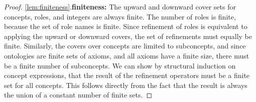 \begin{proof}
\item \ref{lem:finiteness}.\enspace \textbf{finiteness:\enspace}
The upward and downward cover sets for concepts, roles, and integers are always finite. The number of roles is finite, because the set of role names is finite. Since refinement of roles is equivalent to applying the upward or downward covers, the set of refinements must equally be finite. Similarly, the covers over concepts are limited to subconcepts, and since ontologies are finite sets of axioms, and all axioms have a finite size, there must be a finite number of subconcepts. We can show by structural induction on concept expressions, that the result of the refinement operators must be a finite set for all concepts. This follows directly from the fact that the result is always the union of a constant number of finite sets. 


\end{proof}
